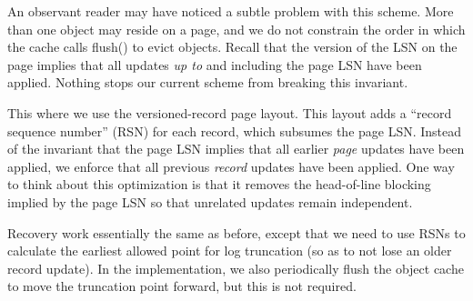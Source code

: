 \documentclass[10pt,letterpaper,twocolumn,english]{article}
\newcommand{\yad}{Lemon\xspace}
\begin{document}
An observant reader may have noticed a subtle problem with this
scheme.  More than one object may reside on a page, and we do not
constrain the order in which the cache calls flush() to evict objects.
Recall that the version of the LSN on the page implies that all
updates {\em up to} and including the page LSN have been applied.
Nothing stops our current scheme from breaking this invariant.  

This where we use the versioned-record page layout. This layout adds a
``record sequence number'' (RSN) for each record, which subsumes the
page LSN.  Instead of the invariant that the page LSN implies that all
earlier {\em page} updates have been applied, we enforce that all
previous {\em record} updates have been applied.  One way to think about
this optimization is that it removes the head-of-line blocking implied
by the page LSN so that unrelated updates remain independent.

Recovery work essentially the same as before, except that we need to
use RSNs to calculate the earliest allowed point for log truncation
(so as to not lose an older record update).  In the implementation, we
also periodically flush the object cache to move the truncation point
forward, but this is not required.



\end{document}
